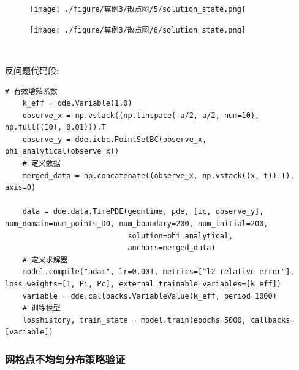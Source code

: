 \documentclass{Sichuan Normal University}
\begin{document}
\begin{figure}[H]
    \centering
    \begin{minipage}[c]{0.48\textwidth}
    \centering
    \texttt{[image: ./figure/算例3/散点图/5/solution\_state.png]}
    \end{minipage}
    \hspace{0.02\textwidth}
    \begin{minipage}[c]{0.48\textwidth}
    \centering
    \texttt{[image: ./figure/算例3/散点图/6/solution\_state.png]}
    \end{minipage}\\[3mm]
    \begin{minipage}[t]{0.48\textwidth}
    \centering
    \label{fig:算例5散点图}
    \end{minipage}
    \hspace{0.02\textwidth}
    \begin{minipage}[t]{0.48\textwidth}
    \centering
    \label{fig:算例6散点图}
    \end{minipage}
    \end{figure}
\noindent 反问题代码段:
\begin{lstlisting}[style=python,basicstyle=\footnotesize\fontspec{Courier New},]  
    # 有效增殖系数
    k_eff = dde.Variable(1.0)
    observe_x = np.vstack((np.linspace(-a/2, a/2, num=10), np.full((10), 0.01))).T
    observe_y = dde.icbc.PointSetBC(observe_x, phi_analytical(observe_x))
    # 定义数据
    merged_data = np.concatenate((observe_x, np.vstack((x, t)).T), axis=0)

    data = dde.data.TimePDE(geomtime, pde, [ic, observe_y], num_domain=num_points_D0, num_boundary=200, num_initial=200,
                            solution=phi_analytical,
                            anchors=merged_data)
    # 定义求解器
    model.compile("adam", lr=0.001, metrics=["l2 relative error"], loss_weights=[1, Pi, Pc], external_trainable_variables=[k_eff])
    variable = dde.callbacks.VariableValue(k_eff, period=1000)
    # 训练模型
    losshistory, train_state = model.train(epochs=5000, callbacks=[variable])
\end{lstlisting}
    
\subsubsection{网格点不均匀分布策略验证}\label{sec:网格点不均匀分布策略验证}
\end{document}
